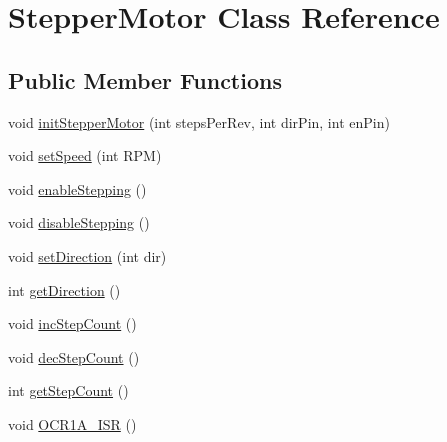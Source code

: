 \hypertarget{class_stepper_motor}{\section{Stepper\+Motor Class Reference}
\label{class_stepper_motor}
}
\subsection*{Public Member Functions}
\begin{DoxyCompactItemize}
\item 
void \hyperlink{class_stepper_motor_a5c0a9dffe05fab7e90bbc006e2aac4fd}{init\+Stepper\+Motor} (int steps\+Per\+Rev, int dir\+Pin, int en\+Pin)
\item 
void \hyperlink{class_stepper_motor_a91c873cea84cff0bd42fbb5d787eb752}{set\+Speed} (int R\+P\+M)
\item 
void \hyperlink{class_stepper_motor_ac6089e2b88799298168206183c8951a2}{enable\+Stepping} ()
\item 
void \hyperlink{class_stepper_motor_a23f13ffe0055a17f74d89af6dd239093}{disable\+Stepping} ()
\item 
void \hyperlink{class_stepper_motor_a09c2801fc67e52d7676b3ab9ba68de18}{set\+Direction} (int dir)
\item 
int \hyperlink{class_stepper_motor_aac6ea43074b0173d145b3aa6b56414ef}{get\+Direction} ()
\item 
void \hyperlink{class_stepper_motor_a18710310b2faa519045f265bbd562241}{inc\+Step\+Count} ()
\item 
void \hyperlink{class_stepper_motor_ac77bf9da222bdb1d76e5e71940072260}{dec\+Step\+Count} ()
\item 
int \hyperlink{class_stepper_motor_a960abf27309b81a269ab8eae07891455}{get\+Step\+Count} ()
\item 
void \hyperlink{class_stepper_motor_a27aaed3e39a1e1ab1846a49c7ae36e56}{O\+C\+R1\+A\+\_\+\+I\+S\+R} ()
\end{DoxyCompactItemize}


